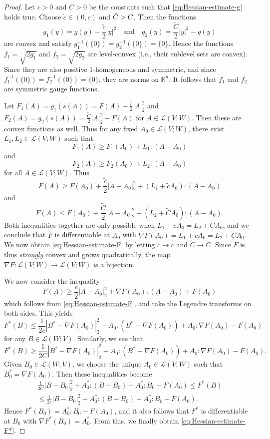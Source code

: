 \documentclass[10pt,a4paper]{amsart}
\newcommand{\R}{\mathbb{R}}
\newcommand{\ndim}{{\bar{n}}}
\newcommand{\Lin}{\mathcal{L}}
\begin{document}
\begin{proof}
Let $c > 0$ and $C > 0$ be the constants such that \eqref{eq:Hessian-estimate-g} holds true.
Choose $\tilde{c} \in (0, c)$ and $\Tilde{C} > C$. Then the functions
\[
g_1(y) = g(y) - \frac{\tilde{c}}{2} |y|^2 \quad \text{and} \quad g_2(y) = \frac{\tilde{C}}{2} |y|^2 - g(y)
\]
are convex and satisfy $g_1^{-1}(\{0\}) = g_2^{-1}(\{0\}) = \{0\}$. Hence the functions $f_1 = \sqrt{2 g_1}$ and $f_2 = \sqrt{2 g_2}$ are level-convex (i.e., their sublevel sets are convex). Since they are also positive $1$-homogeneous and symmetric, and since $f_1^{-1}(\{0\}) = f_2^{-1}(\{0\}) = \{0\}$, they are
norms on $\R^\ndim$. It follows that $f_1$ and $f_2$ are symmetric gauge functions.

Let $F_1(A) = g_1(s(A)) = F(A) - \frac{\tilde{c}}{2} |A|_2^2$ and $F_2(A) = g_2(s(A)) = \frac{\tilde{C}}{2}|A|_2^2 - F(A)$ for $A \in \Lin(V; W)$. Then these are convex functions as well. Thus for any fixed $A_0 \in \Lin(V; W)$, there exist $L_1, L_2 \in \Lin(V; W)$ such that
\[
F_1(A) \ge F_1(A_0) + L_1 : (A - A_0)
\]
and
\[
F_2(A) \ge F_2(A_0) + L_2 : (A - A_0)
\]
for all $A \in \Lin(V; W)$. Thus
\[
F(A) \ge F(A_0) + \frac{\tilde{c}}{2} |A - A_0|_2^2 + (L_1 + \tilde{c}A_0) : (A - A_0)
\]
and
\[
F(A) \le F(A_0) + \frac{\tilde{C}}{2} |A - A_0|_2^2 + (L_2 + \tilde{C}A_0) : (A - A_0).
\]
Both inequalities together are only possible when $L_1 + \tilde{c} A_0 = L_2 + \tilde{C} A_0$, and we conclude that $F$ is differentiable at $A_0$
with $\nabla F(A_0) = L_1 + \tilde{c} A_0 = L_2 + \tilde{C} A_0$.
We now obtain \eqref{eq:Hessian-estimate-F} by letting $\tilde{c} \to c$ and $\tilde{C} \to C$.
Since $F$ is thus \emph{strongly} convex and grows quadratically, the map $\nabla F \colon \Lin(V; W) \to \Lin(V; W)$ is a bijection.

We now consider the inequality
\[
F(A) \ge \frac{c}{2} |A - A_0|_2^2 + \nabla F(A_0) : (A - A_0) + F(A_0) 
\]
which follows from \eqref{eq:Hessian-estimate-F}, and take the Legendre transforms on both sides. This yields
\[
F^*(B) \le \frac{1}{2c} |B^* - \nabla F(A_0)|_2^2 + A_0 : (B^* - \nabla F(A_0)) + A_0 : \nabla F(A_0) - F(A_0)
\]
for any $B \in \Lin(W; V)$. Similarly, we see that
\[
F^*(B) \ge \frac{1}{2C} |B^* - \nabla F(A_0)|_2^2 + A_0 : (B^* - \nabla F(A_0)) + A_0 : \nabla F(A_0) - F(A_0).
\]
Given $B_0 \in \Lin(W; V)$, we choose the unique $A_0 \in \Lin(V; W)$ such that $B_0^* = \nabla F(A_0)$. Then these inequalities become
\begin{multline*}
\frac{1}{2C} |B - B_0|_2^2 + A_0^* : (B - B_0) + A_0^* : B_0 - F(A_0) \le F^*(B) \\
\le \frac{1}{2c} |B - B_0|_2^2 + A_0^* : (B - B_0) + A_0^* : B_0 - F(A_0).
\end{multline*}
Hence $F^*(B_0) = A_0^* : B_0 - F(A_0)$, and it also follows that
$F^*$ is differentiable at $B_0$ with $\nabla F^*(B_0) = A_0^*$. 
From this, we finally obtain \eqref{eq:Hessian-estimate-F*}.
\end{proof}
\end{document}
